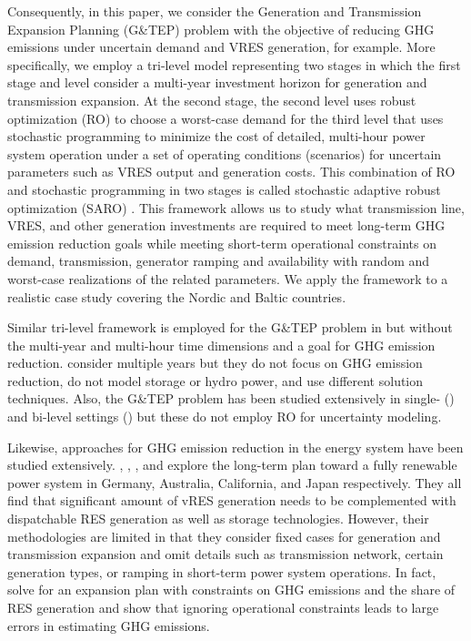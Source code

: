 \documentclass[final]{IEEEtran}
\begin{document}
Consequently, in this paper, we consider the Generation and Transmission Expansion Planning (G\&TEP) problem with the objective of reducing GHG emissions under uncertain demand and VRES generation, for example. More specifically, we employ a tri-level model representing two stages in which the first stage and level consider a multi-year investment horizon for generation and transmission expansion. At the second stage, the second level uses robust optimization (RO) to choose a worst-case demand for the third level that uses stochastic programming to minimize the cost of detailed, multi-hour power system operation under a set of operating conditions (scenarios) for uncertain parameters such as VRES output and generation costs. This combination of RO and stochastic programming in two stages is called stochastic adaptive robust optimization (SARO) \cite{Baringo2018}. This framework allows us to study what transmission line, VRES, and other generation investments are required to meet long-term GHG emission reduction goals while meeting short-term operational constraints on demand, transmission, generator ramping and availability with random and worst-case realizations of the related parameters. We apply the framework to a realistic case study covering the Nordic and Baltic countries.


Similar tri-level framework is employed for the G\&TEP problem in \cite{Minguez, Moreira, Baringo2018} but without the multi-year and multi-hour time dimensions and a goal for GHG emission reduction. \cite{Li, Roldan} consider multiple years but they do not focus on GHG emission reduction, do not model storage or hydro power, and use different solution techniques. Also, the G\&TEP problem has been studied extensively in single- (\cite{Lopez, Dominguez, Munoz, Chen}) and bi-level settings (\cite{Zhang, Pisciella, Maurovich}) but these do not employ RO for uncertainty modeling.

Likewise, approaches for GHG emission reduction in the energy system have been studied extensively. \cite{Hansen}, \cite{Blakers}, \cite{Colbertaldo}, and \cite{Esteban} explore the long-term plan toward a fully renewable power system in Germany, Australia, California, and Japan respectively. They all find that significant amount of vRES generation needs to be complemented with dispatchable RES generation as well as storage technologies. However, their methodologies are limited in that they consider fixed cases for generation and transmission expansion and omit details such as transmission network, certain generation types, or ramping in short-term power system operations. In fact, \cite{Palmintier} solve for an expansion plan with constraints on GHG emissions and the share of RES generation and show that ignoring operational constraints leads to large errors in estimating GHG emissions.
\end{document}
